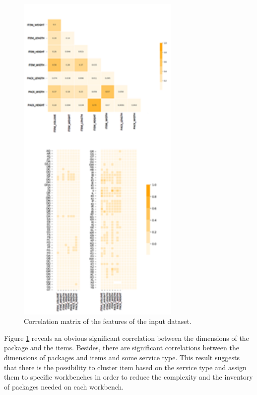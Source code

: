 \begin{figure}[hbt!]
\centering
\includegraphics[width=0.7\textwidth]{sectionProduction/design_plant_figures/fig_prod_CHIMAR_prodFamilies.png}
\captionsetup{type=figure}
\caption{Correlation matrix of the features of the input dataset.}
\label{fig_prod_CHIMAR_prodFamilies}
\end{figure}

Figure \ref{fig_prod_CHIMAR_prodFamilies} reveals an obvious significant correlation between the dimensions of the package and the items. Besides, there are significant correlations between the dimensions of packages and items and some service type. This result suggests that there is the possibility to cluster item based on the service type and assign them to specific workbenches in order to reduce the complexity and the inventory of packages needed on each workbench.\par

